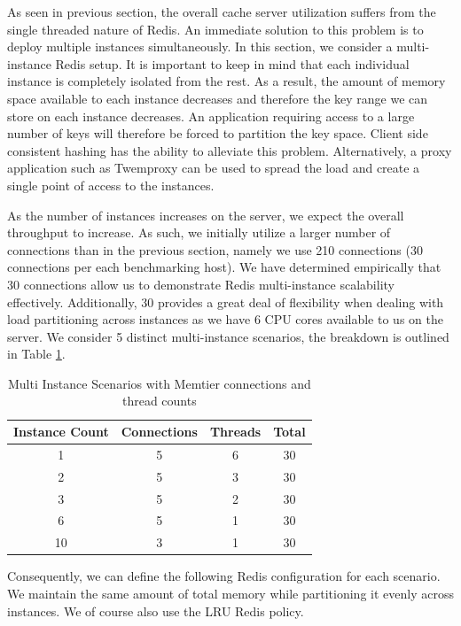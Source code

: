 As seen in previous section, the overall cache server utilization suffers from the single threaded nature of Redis. An immediate solution to this problem is to deploy multiple instances simultaneously. In this section, we consider a multi-instance Redis setup. It is important to keep in mind that each individual instance is completely isolated from the rest. As a result, the amount of memory space available to each instance decreases and therefore the key range we can store on each instance decreases. An application requiring access to a large number of keys will therefore be forced to partition the key space. Client side consistent hashing has the ability to alleviate this problem. Alternatively, a proxy application such as Twemproxy \cite{twemproxy} can be used to spread the load and create a single point of access to the instances.

As the number of instances increases on the server, we expect the overall throughput to increase. As such, we initially utilize a larger number of connections than in the previous section, namely we use 210 connections (30 connections per each benchmarking host). We have determined empirically that 30 connections allow us to demonstrate Redis multi-instance scalability effectively. Additionally, 30 provides a great deal of flexibility when dealing with load partitioning across instances as we have 6 CPU cores available to us on the server. We consider 5 distinct multi-instance scenarios, the breakdown is outlined in Table \ref{tab:redis_instances}.

\begin{table}[h!]
\centering
\begin{tabular}{| c c c c |}
 \hline
 Instance Count & Connections & Threads & Total\\ [0.5ex]
 \hline\hline

 1  & 5 & 6 & 30 \\
 2  & 5 & 3 & 30 \\
 3  & 5 & 2 & 30 \\
 6  & 5 & 1 & 30 \\
 10 & 3 & 1 & 30 \\
 \hline

\end{tabular}
\caption{Multi Instance Scenarios with Memtier connections and thread counts}
\label{tab:redis_instances}
\end{table}

Consequently, we can define the following Redis configuration for each scenario. We maintain the same amount of total memory while partitioning it evenly across instances. We of course also use the LRU Redis policy.

